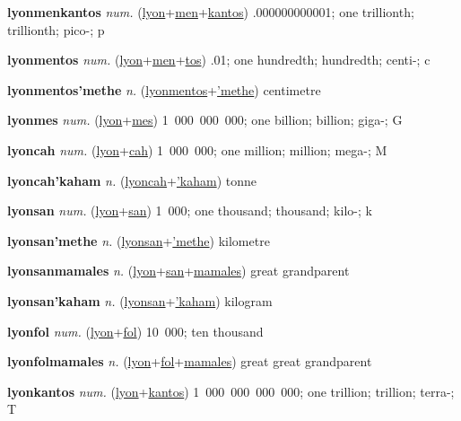 \textbf{\hypertarget{lyonmenkantos}{lyonmenkantos}} \textit{num.} (\hyperlink{lyon}{lyon}+\allowbreak \hyperlink{men}{men}+\allowbreak \hyperlink{kantos}{kantos})
.000000000001; one trillionth; trillionth; pico-; p

\textbf{\hypertarget{lyonmentos}{lyonmentos}} \textit{num.} (\hyperlink{lyon}{lyon}+\allowbreak \hyperlink{men}{men}+\allowbreak \hyperlink{tos}{tos})
.01; one hundredth; hundredth; centi-; c

\textbf{\hypertarget{lyonmentos'methe}{lyonmentos'methe}} \textit{n.} (\hyperlink{lyonmentos}{lyonmentos}+\allowbreak \hyperlink{'methe}{'methe})
centimetre

\textbf{\hypertarget{lyonmes}{lyonmes}} \textit{num.} (\hyperlink{lyon}{lyon}+\allowbreak \hyperlink{mes}{mes})
1~000~000~000; one billion; billion; giga-; G

\textbf{\hypertarget{lyoncah}{lyoncah}} \textit{num.} (\hyperlink{lyon}{lyon}+\allowbreak \hyperlink{cah}{cah})
1~000~000; one million; million; mega-; M

\textbf{\hypertarget{lyoncah'kaham}{lyoncah'kaham}} \textit{n.} (\hyperlink{lyoncah}{lyoncah}+\allowbreak \hyperlink{'kaham}{'kaham})
tonne

\textbf{\hypertarget{lyonsan}{lyonsan}} \textit{num.} (\hyperlink{lyon}{lyon}+\allowbreak \hyperlink{san}{san})
1~000; one thousand; thousand; kilo-; k

\textbf{\hypertarget{lyonsan'methe}{lyonsan'methe}} \textit{n.} (\hyperlink{lyonsan}{lyonsan}+\allowbreak \hyperlink{'methe}{'methe})
kilometre

\textbf{\hypertarget{lyonsanmamales}{lyonsanmamales}} \textit{n.} (\hyperlink{lyon}{lyon}+\allowbreak \hyperlink{san}{san}+\allowbreak \hyperlink{mamales}{mamales})
great grandparent

\textbf{\hypertarget{lyonsan'kaham}{lyonsan'kaham}} \textit{n.} (\hyperlink{lyonsan}{lyonsan}+\allowbreak \hyperlink{'kaham}{'kaham})
kilogram

\textbf{\hypertarget{lyonfol}{lyonfol}} \textit{num.} (\hyperlink{lyon}{lyon}+\allowbreak \hyperlink{fol}{fol})
10~000; ten thousand

\textbf{\hypertarget{lyonfolmamales}{lyonfolmamales}} \textit{n.} (\hyperlink{lyon}{lyon}+\allowbreak \hyperlink{fol}{fol}+\allowbreak \hyperlink{mamales}{mamales})
great great grandparent

\textbf{\hypertarget{lyonkantos}{lyonkantos}} \textit{num.} (\hyperlink{lyon}{lyon}+\allowbreak \hyperlink{kantos}{kantos})
1~000~000~000~000; one trillion; trillion; terra-; T

